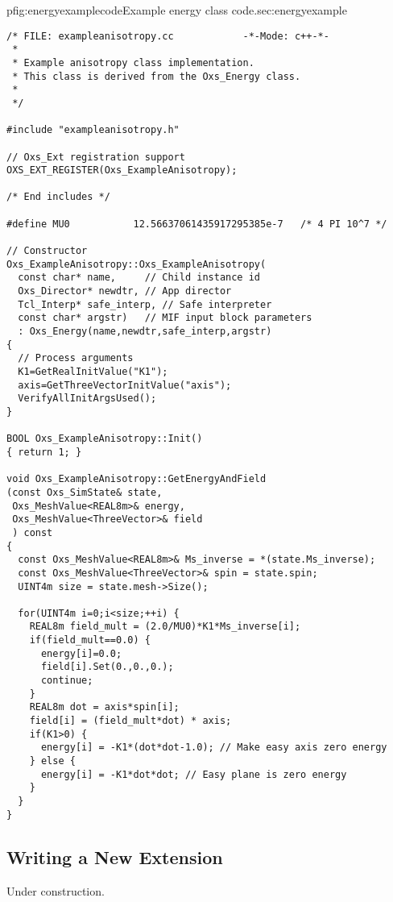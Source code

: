 \begin{codelisting}{p}{fig:energyexamplecode}{Example energy class
code.}{sec:energyexample}
\begin{verbatim}
/* FILE: exampleanisotropy.cc            -*-Mode: c++-*-
 *
 * Example anisotropy class implementation.
 * This class is derived from the Oxs_Energy class.
 *
 */

#include "exampleanisotropy.h"

// Oxs_Ext registration support
OXS_EXT_REGISTER(Oxs_ExampleAnisotropy);

/* End includes */

#define MU0           12.56637061435917295385e-7   /* 4 PI 10^7 */

// Constructor
Oxs_ExampleAnisotropy::Oxs_ExampleAnisotropy(
  const char* name,     // Child instance id
  Oxs_Director* newdtr, // App director
  Tcl_Interp* safe_interp, // Safe interpreter
  const char* argstr)   // MIF input block parameters
  : Oxs_Energy(name,newdtr,safe_interp,argstr)
{
  // Process arguments
  K1=GetRealInitValue("K1");
  axis=GetThreeVectorInitValue("axis");
  VerifyAllInitArgsUsed();
}

BOOL Oxs_ExampleAnisotropy::Init()
{ return 1; }

void Oxs_ExampleAnisotropy::GetEnergyAndField
(const Oxs_SimState& state,
 Oxs_MeshValue<REAL8m>& energy,
 Oxs_MeshValue<ThreeVector>& field
 ) const
{
  const Oxs_MeshValue<REAL8m>& Ms_inverse = *(state.Ms_inverse);
  const Oxs_MeshValue<ThreeVector>& spin = state.spin;
  UINT4m size = state.mesh->Size();

  for(UINT4m i=0;i<size;++i) {
    REAL8m field_mult = (2.0/MU0)*K1*Ms_inverse[i];
    if(field_mult==0.0) {
      energy[i]=0.0;
      field[i].Set(0.,0.,0.);
      continue;
    }
    REAL8m dot = axis*spin[i];
    field[i] = (field_mult*dot) * axis;
    if(K1>0) {
      energy[i] = -K1*(dot*dot-1.0); // Make easy axis zero energy
    } else {
      energy[i] = -K1*dot*dot; // Easy plane is zero energy
    }
  }
}
\end{verbatim}
\end{codelisting}


\subsection{Writing a New  Extension}\label{sec:energynew}
Under construction.






